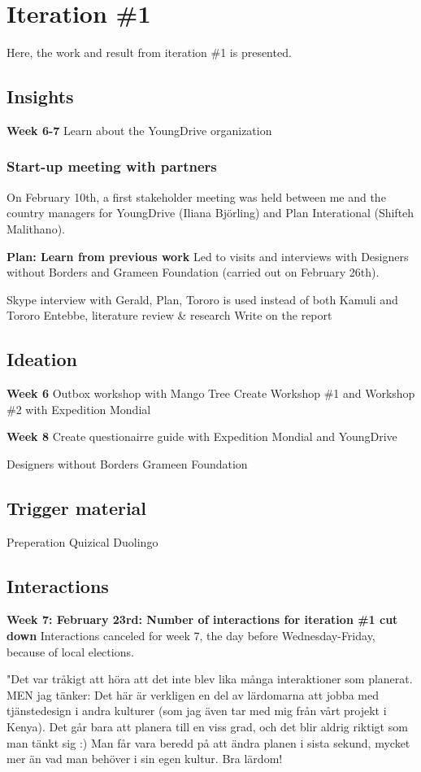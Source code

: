\section{Iteration \#1}
Here, the work and result from iteration \#1 is presented.

\subsection*{Insights}
\textbf{Week 6-7}
Learn about the YoungDrive organization

\subsubsection{Start-up meeting with partners}
On February 10th, a first stakeholder meeting was held between me and the country managers for YoungDrive (Iliana Björling) and Plan Interational (Shifteh Malithano).

\textbf{Plan: Learn from previous work}
Led to visits and interviews with Designers without Borders and Grameen Foundation (carried out on February 26th).

Skype interview with Gerald, Plan, Tororo is used instead of both Kamuli and Tororo
Entebbe, literature review \& research
Write on the report

\subsection*{Ideation}
\textbf{Week 6}
Outbox workshop with Mango Tree
Create Workshop \#1 and Workshop \#2 with Expedition Mondial

\textbf{Week 8}
Create questionairre guide with Expedition Mondial and YoungDrive

Designers without Borders
Grameen Foundation

\subsection*{Trigger material}
Preperation
Quizical
Duolingo

\subsection*{Interactions}
\textbf{Week 7: February 23rd: Number of interactions for iteration \#1 cut down}
Interactions canceled for week 7, the day before Wednesday-Friday, because of local elections.

"Det var tråkigt att höra att det inte blev lika många interaktioner som planerat.
MEN jag tänker: Det här är verkligen en del av lärdomarna att jobba med tjänstedesign i andra kulturer (som jag även tar med mig från vårt projekt i Kenya). Det går bara att planera till en viss grad, och det blir aldrig riktigt som man tänkt sig :) Man får vara beredd på att ändra planen i sista sekund, mycket mer än vad man behöver i sin egen kultur. Bra lärdom!

